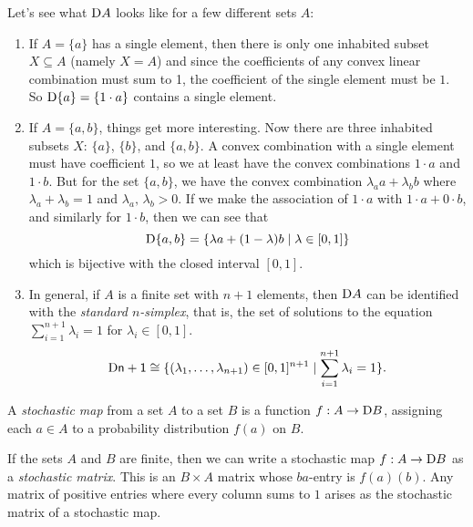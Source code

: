 \documentclass[DynamicalBook]{subfiles}
\begin{document}
\begin{example}
  Let's see what $\mathrm{D} A$ looks like for a few different sets $A$:
  \begin{enumerate}
    \item If $A = \{a\}$ has a single element, then there is only one inhabited
      subset $X \subseteq A$ (namely $X = A$) and since the coefficients of any
      convex linear combination must sum to 1, the coefficient of the single
      element must be $1$. So $\mathrm{D} \{a\} = \{1 \cdot a\}$ contains a single element.
    \item If $A = \{a, b\}$, things get more interesting. Now there are three
      inhabited subsets $X$: $\{a\}$, $\{b\}$, and $\{a, b\}$. A convex
      combination with a single element must have coefficient $1$, so we at
      least have the convex combinations $1 \cdot a$ and $1 \cdot b$. But for
      the set $\{a, b\}$, we have the convex combination
      $\lambda_a a + \lambda_b b$ where $\lambda_a + \lambda_b = 1$ and
      $\lambda_a,\, \lambda_b > 0$. If we make the association of $1 \cdot a$
      with $1\cdot a + 0 \cdot b$, and similarly for $1 \cdot b$, then we can
      see that
      \[
\mathrm{D} \{a, b\} = \{\lambda a + (1 - \lambda) b \mid \lambda \in [0, 1]\}
      \]
      which is bijective with the closed interval $[0, 1]$.
    \item In general, if $A$ is a finite set with $n + 1$ elements, then $\mathrm{D}
      A$ can be identified with the \emph{standard $n$-simplex}, that is, the
      set of solutions to the equation
      $\sum_{i = 1}^{n + 1} \lambda_i = 1$
      for $\lambda_i \in [0,1]$.
      \[
\mathrm{D} \mathsf{n + 1} \cong \{(\lambda_1, \ldots, \lambda_{n + 1}) \in [0,1]^{n + 1} \mid \sum_{i
= 1}^{n+1} \lambda_i = 1\}.
      \]
  \end{enumerate}
\end{example}

\begin{definition}\label{def.stochastic_map}
 A \emph{stochastic map} from a set $A$ to a set $B$ is a function $f : A
 \to \mathrm{D} B$, assigning each $a \in A$ to a probability distribution $f(a)$
 on $B$.

 If the sets $A$ and $B$ are finite, then we can write a stochastic map $f
 : A \to \mathrm{D} B$ as a \emph{stochastic matrix}. This is an $B \times A$
 matrix whose $ba$-entry is $f(a)(b)$. Any matrix of positive entries where
 every column sums to $1$ arises as the stochastic matrix of a stochastic map.
\end{definition}
\end{document}
